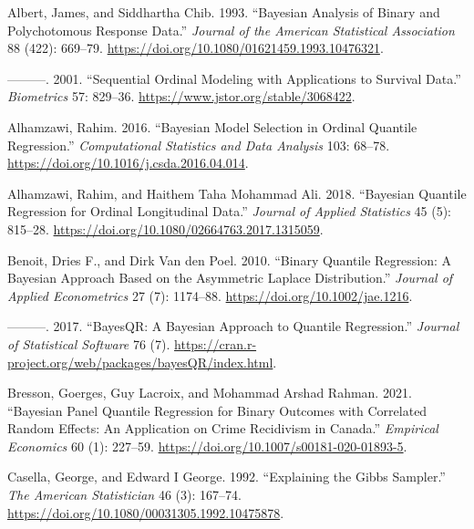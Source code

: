 \hypertarget{refs}{}
\begin{CSLReferences}{1}{0}
\leavevmode{}%
Albert, James, and Siddhartha Chib. 1993. {``Bayesian Analysis of Binary and Polychotomous Response Data.''} \emph{{Journal of the American Statistical Association}} 88 (422): 669--79. \url{https://doi.org/10.1080/01621459.1993.10476321}.

\leavevmode{}%
---------. 2001. {``Sequential Ordinal Modeling with Applications to Survival Data.''} \emph{Biometrics} 57: 829--36. \url{https://www.jstor.org/stable/3068422}.

\leavevmode{}%
Alhamzawi, Rahim. 2016. {``Bayesian Model Selection in Ordinal Quantile Regression.''} \emph{{Computational Statistics and Data Analysis}} 103: 68--78. \url{https://doi.org/10.1016/j.csda.2016.04.014}.

\leavevmode{}%
Alhamzawi, Rahim, and Haithem Taha Mohammad Ali. 2018. {``Bayesian Quantile Regression for Ordinal Longitudinal Data.''} \emph{Journal of Applied Statistics} 45 (5): 815--28. \url{https://doi.org/10.1080/02664763.2017.1315059}.

\leavevmode{}%
Benoit, Dries F., and Dirk Van den Poel. 2010. {``Binary Quantile Regression: A {B}ayesian Approach Based on the Asymmetric {L}aplace Distribution.''} \emph{Journal of Applied Econometrics} 27 (7): 1174--88. \url{https://doi.org/10.1002/jae.1216}.

\leavevmode{}%
---------. 2017. {``Bayes{QR}: A {B}ayesian Approach to Quantile Regression.''} \emph{Journal of Statistical Software} 76 (7). \url{https://cran.r-project.org/web/packages/bayesQR/index.html}.

\leavevmode{}%
Bresson, Goerges, Guy Lacroix, and Mohammad Arshad Rahman. 2021. {``Bayesian Panel Quantile Regression for Binary Outcomes with Correlated Random Effects: An Application on Crime Recidivism in {Canada}.''} \emph{Empirical Economics} 60 (1): 227--59. \url{https://doi.org/10.1007/s00181-020-01893-5}.

\leavevmode{}%
Casella, George, and Edward I George. 1992. {``Explaining the {Gibbs} Sampler.''} \emph{The American Statistician} 46 (3): 167--74. \url{https://doi.org/10.1080/00031305.1992.10475878}.


\end{CSLReferences}

